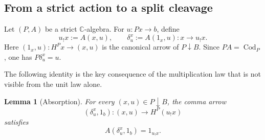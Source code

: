 \documentclass[11pt]{article}
\theoremstyle{plain}
\newtheorem{lemma}[theorem]{Lemma}
\theoremstyle{definition}
\theoremstyle{remark}
\newcommand{\Cod}{\operatorname{Cod}}
\newcommand{\C}{\mathbb{C}}
\numberwithin{equation}{section}
\begin{document}
\subsection{From a strict action to a split cleavage}

Let $(P,A)$ be a strict $\C$-algebra.  For
$u\colon Px\to b$, define
\begin{equation}
u_{!}x:=A(x,u),
  \qquad
  \delta^{x}_{u}:=A(1_x,u)
  \colon x\longrightarrow u_{!}x.
  \label{eq:delta-from-action}
\end{equation}
Here $(1_x,u)\colon H^{P}x\to(x,u)$ is the canonical arrow of
$P\!\downarrow\!B$.  Since $PA=\Cod_P$, one has
$P\delta^{x}_{u}=u$.

The following identity is the key consequence of the multiplication
law that is not visible from the unit law alone.

\begin{lemma}[Absorption]\label{lem:absorption}
For every $(x,u)\in P\!\downarrow\!B$, the comma arrow
\begin{equation*}
(\delta^{x}_{u},1_b)\colon(x,u)\longrightarrow H^{P}(u_{!}x)
\end{equation*}
satisfies
\begin{equation}
A(\delta^{x}_{u},1_b)=1_{u_{!}x}.
  \label{eq:absorption}
\end{equation}
\end{lemma}
\end{document}
